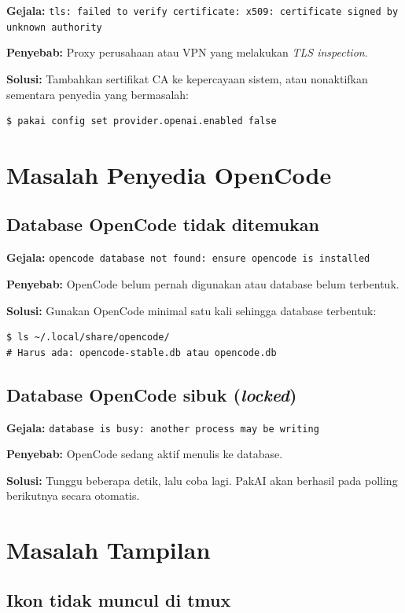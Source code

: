 \textbf{Gejala:} \texttt{tls: failed to verify certificate: x509: certificate signed by unknown authority}

\textbf{Penyebab:} Proxy perusahaan atau VPN yang melakukan \textit{TLS inspection}.

\textbf{Solusi:} Tambahkan sertifikat CA ke kepercayaan sistem, atau nonaktifkan
sementara penyedia yang bermasalah:
\begin{lstlisting}[style=terminal]
$ pakai config set provider.openai.enabled false
\end{lstlisting}

\section{Masalah Penyedia OpenCode}

\subsection{Database OpenCode tidak ditemukan}

\textbf{Gejala:} \texttt{opencode database not found: ensure opencode is installed}

\textbf{Penyebab:} OpenCode belum pernah digunakan atau database belum terbentuk.

\textbf{Solusi:} Gunakan OpenCode minimal satu kali sehingga database terbentuk:
\begin{lstlisting}[style=terminal]
$ ls ~/.local/share/opencode/
# Harus ada: opencode-stable.db atau opencode.db
\end{lstlisting}

\subsection{Database OpenCode sibuk (\textit{locked})}

\textbf{Gejala:} \texttt{database is busy: another process may be writing}

\textbf{Penyebab:} OpenCode sedang aktif menulis ke database.

\textbf{Solusi:} Tunggu beberapa detik, lalu coba lagi. PakAI akan berhasil
pada polling berikutnya secara otomatis.

\section{Masalah Tampilan}

\subsection{Ikon tidak muncul di tmux}

